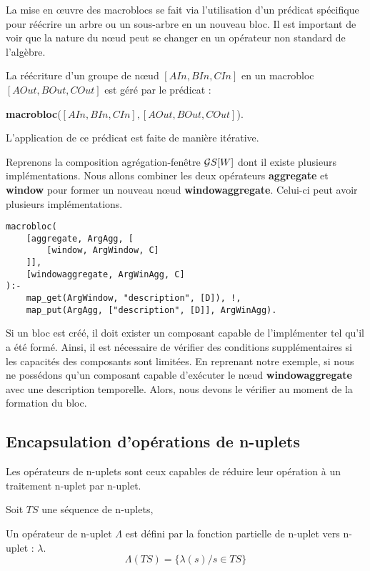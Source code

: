 La mise en œuvre des macroblocs se fait via l'utilisation d'un prédicat spécifique pour réécrire un arbre ou un sous-arbre en un nouveau bloc. Il est important de voir que la nature du nœud peut se changer en un opérateur non standard de l'algèbre.
\begin{regle}
La réécriture d'un groupe de nœud $[AIn,BIn,CIn]$ en un macrobloc $[AOut,BOut,COut]$ est géré par le prédicat :
\begin{center} \textbf{macrobloc}($[AIn,BIn,CIn],[AOut,BOut,COut]$).\end{center}
L'application de ce prédicat est faite de manière itérative.
\end{regle}
\begin{example}
    Reprenons la composition agrégation-fenêtre $\mathcal{G} S[W]$ dont il existe plusieurs implémentations. Nous allons combiner les deux opérateurs \textbf{aggregate} et \textbf{window} pour former un nouveau nœud \textbf{windowaggregate}. Celui-ci peut avoir plusieurs implémentations.
    \begin{lstlisting}
macrobloc(
    [aggregate, ArgAgg, [
        [window, ArgWindow, C]
    ]], 
    [windowaggregate, ArgWinAgg, C]
):-
    map_get(ArgWindow, "description", [D]), !,
    map_put(ArgAgg, ["description", [D]], ArgWinAgg). 
    \end{lstlisting}
\end{example}
Si un bloc est créé, il doit exister un composant capable de l'implémenter tel qu'il a été formé. Ainsi, il est nécessaire de vérifier des conditions supplémentaires si les capacités des composants sont limitées. En reprenant notre exemple, si nous ne possédons qu'un composant capable d'exécuter le nœud \textbf{windowaggregate} avec une description temporelle. Alors, nous devons le vérifier au moment de la formation du bloc.

\subsection{Encapsulation d'opérations de n-uplets}
Les opérateurs de n-uplets sont ceux capables de réduire leur opération à un traitement n-uplet par n-uplet.
\begin{defi}\label{def:operateurtuple}
    Soit $TS$ une séquence de n-uplets,

    Un opérateur de n-uplet $\Lambda$ est défini par la fonction partielle de n-uplet vers n-uplet : $\lambda$.
    $$\Lambda(TS) = \{\lambda(s) / s \in TS \}$$
\end{defi}

